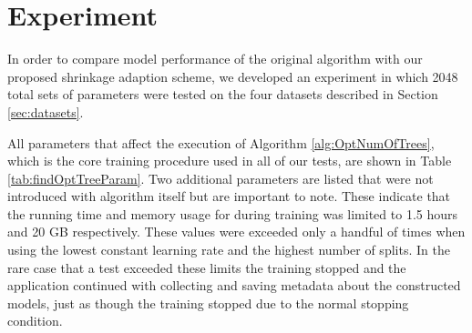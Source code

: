 \documentclass[9pt, conference]{IEEEtran}
\begin{document}
\section {Experiment}
In order to compare model performance of the original algorithm with our proposed shrinkage adaption scheme, we developed an experiment in which 2048 total sets of parameters were tested on the four datasets described in Section \ref{sec:datasets}. 

All parameters that affect the execution of Algorithm \ref{alg:OptNumOfTrees}, which is the core training procedure used in all of our tests, are shown in Table \ref{tab:findOptTreeParam}. Two additional parameters are listed that were not introduced with algorithm itself but are important to note. These indicate that the running time and memory usage for during training was limited to 1.5 hours and 20 GB respectively. These values were exceeded only a handful of times when using the lowest constant learning rate and the highest number of splits. In the rare case that a test exceeded these limits the training stopped and the application continued with collecting and saving metadata about the constructed models, just as though the training stopped due to the normal stopping condition.
\end{document}
